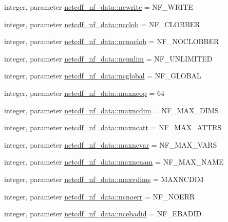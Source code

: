 \begin{DoxyCompactItemize}
\item 
integer, parameter \hyperlink{namespacenetcdf__nf__data_a8531d390a08862ce18bcb314168801cc}{netcdf\+\_\+nf\+\_\+data\+::ncwrite} = N\+F\+\_\+\+W\+R\+I\+TE
\item 
integer, parameter \hyperlink{namespacenetcdf__nf__data_a390b90425185669675d58dd9166deea1}{netcdf\+\_\+nf\+\_\+data\+::ncclob} = N\+F\+\_\+\+C\+L\+O\+B\+B\+ER
\item 
integer, parameter \hyperlink{namespacenetcdf__nf__data_af61770c9009f96909807d8a86849a191}{netcdf\+\_\+nf\+\_\+data\+::ncnoclob} = N\+F\+\_\+\+N\+O\+C\+L\+O\+B\+B\+ER
\item 
integer, parameter \hyperlink{namespacenetcdf__nf__data_af5632bf38434d6b35a1ffe750a5a74ec}{netcdf\+\_\+nf\+\_\+data\+::ncunlim} = N\+F\+\_\+\+U\+N\+L\+I\+M\+I\+T\+ED
\item 
integer, parameter \hyperlink{namespacenetcdf__nf__data_a9cc4e6ebfcd3becf1dcab3152fb47d28}{netcdf\+\_\+nf\+\_\+data\+::ncglobal} = N\+F\+\_\+\+G\+L\+O\+B\+AL
\item 
integer, parameter \hyperlink{namespacenetcdf__nf__data_a4095eb49dd5074dec84db1148a92c594}{netcdf\+\_\+nf\+\_\+data\+::maxncop} = 64
\item 
integer, parameter \hyperlink{namespacenetcdf__nf__data_af99c14cab35f6ca0ee15b37097449c02}{netcdf\+\_\+nf\+\_\+data\+::maxncdim} = N\+F\+\_\+\+M\+A\+X\+\_\+\+D\+I\+MS
\item 
integer, parameter \hyperlink{namespacenetcdf__nf__data_a316ad97cae409a49b989f1810a57b478}{netcdf\+\_\+nf\+\_\+data\+::maxncatt} = N\+F\+\_\+\+M\+A\+X\+\_\+\+A\+T\+T\+RS
\item 
integer, parameter \hyperlink{namespacenetcdf__nf__data_a8b7b8fa672979d04cbba61c44082ee90}{netcdf\+\_\+nf\+\_\+data\+::maxncvar} = N\+F\+\_\+\+M\+A\+X\+\_\+\+V\+A\+RS
\item 
integer, parameter \hyperlink{namespacenetcdf__nf__data_adcf62a4007872312900df1fd1fbffaa9}{netcdf\+\_\+nf\+\_\+data\+::maxncnam} = N\+F\+\_\+\+M\+A\+X\+\_\+\+N\+A\+ME
\item 
integer, parameter \hyperlink{namespacenetcdf__nf__data_af343b93b6e2963d388986795d5d71de5}{netcdf\+\_\+nf\+\_\+data\+::maxvdims} = M\+A\+X\+N\+C\+D\+IM
\item 
integer, parameter \hyperlink{namespacenetcdf__nf__data_a565c69bf6a7a8cf5736e86c239373273}{netcdf\+\_\+nf\+\_\+data\+::ncnoerr} = N\+F\+\_\+\+N\+O\+E\+RR
\item 
integer, parameter \hyperlink{namespacenetcdf__nf__data_afca989ca485a79e6842bb7a72cfc639f}{netcdf\+\_\+nf\+\_\+data\+::ncebadid} = N\+F\+\_\+\+E\+B\+A\+D\+ID

\end{DoxyCompactItemize}
